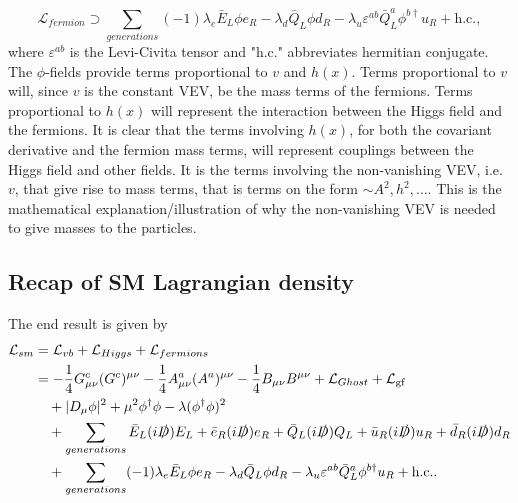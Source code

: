 \begin{equation}
	\mathcal{L}_{fermion}\supset \sum_{generations}(-1)\lambda_e\bar{E}_L\phi e_R-\lambda_d\bar{Q}_L\phi d_R-\lambda_u\varepsilon^{ab}\bar{Q}_L^a\phi^{b\dagger}u_R+\text{h.c.},
\end{equation} 
where $\varepsilon^{ab}$ is the Levi-Civita tensor and "h.c." abbreviates hermitian conjugate. The $\phi$-fields provide terms proportional to $v$ and $h(x)$. Terms proportional to $v$ will, since $v$ is the constant VEV, be the mass terms of the fermions. Terms proportional to $h(x)$ will represent the interaction between the Higgs field and the fermions. It is clear that the terms involving $h(x)$, for both the covariant derivative and the fermion mass terms, will represent couplings between the Higgs field and other fields. It is the terms involving the non-vanishing VEV, i.e. $v$, that give rise to mass terms, that is terms on the form $\sim A^2,h^2,\dots$. This is the mathematical explanation/illustration of why the non-vanishing VEV is needed to give masses to the particles.

\subsection*{Recap of SM Lagrangian density}
The end result is given by
\begin{equation}
	\begin{split}
		\mathcal{L}_{sm}&=\mathcal{L}_{vb}+\mathcal{L}_{Higgs}+\mathcal{L}_{fermions}\\
		&=-\frac{1}{4}G^c_{\mu\nu}(G^c)^{\mu\nu}-\frac{1}{4}A^a_{\mu\nu}(A^a)^{\mu\nu}-\frac{1}{4}B_{\mu\nu}B^{\mu\nu}+\mathcal{L}_{Ghost}+\mathcal{L}_{\text{gf}}\\
		&\quad+|D_\mu\phi|^2+\mu^2\phi^\dagger\phi-\lambda(\phi^\dagger\phi)^2\\
		&\quad+\sum_{generations}\bar{E}_L(i\slashed D)E_L+\bar{e}_R(i\slashed D)e_R+\bar{Q}_L(i \slashed D)Q_L+\bar{u}_R(i \slashed D)u_R+\bar{d}_R(i \slashed D)d_R\\
		&\quad+\sum_{generations}(-1)\lambda_e\bar{E}_L\phi e_R-\lambda_d\bar{Q}_L\phi d_R-\lambda_u\varepsilon^{ab}\bar{Q}_L^a\phi^{b\dagger}u_R+\text{h.c.}.\\
	\end{split}
\end{equation} 


